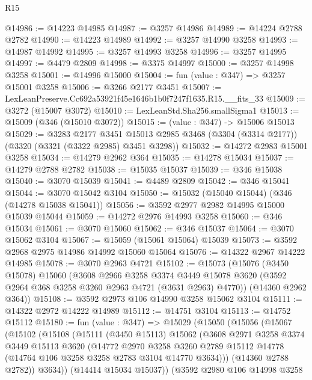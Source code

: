 \begin{lexlean}{R15}
\begin{coremodule}
@14986 := @14223 @14985
@14987 := @3257 @14986
@14989 := @14224 @2788 @2782
@14990 := @14223 @14989
@14992 := @3257 @14990 @3258
@14993 := @14987 @14992
@14995 := @3257 @14993 @3258
@14996 := @3257 @14995
@14997 := @4479 @2809
@14998 := @3375 @14997
@15000 := @3257 @14998 @3258
@15001 := @14996 @15000
@15004 := fun (value : @347) => @3257 @15001 @3258
@15006 := @3266 @2177 @3451
@15007 := LexLeanPreserve.Cc692a53921f45e1646b1b0f7247f1635.R15.__fits_33
@15009 := @3272 (@15007 @3072)
@15010 := LexLeanStd.Sha256.smallSigma1
@15013 := @15009 (@346 (@15010 @3072))
@15015 := (value : @347) -> @15006 @15013
@15029 := @3283
    @2177
    @3451
    @15013
    @2985
    @3468
    (@3304 (@3314 @2177))
    (@3320 (@3321 (@3322 @2985) @3451 @3298))
@15032 := @14272 @2983 @15001 @3258
@15034 := @14279 @2962 @364
@15035 := @14278 @15034
@15037 := @14279 @2788 @2782
@15038 := @15035 @15037
@15039 := @346 @15038
@15040 := @3070 @15039
@15041 := @4489 @2809
@15042 := @346 @15041
@15044 := @3070 @15042 @3104
@15050 := @15032 (@15040 @15044) (@346 (@14278 @15038 @15041))
@15056 := @3592 @2977 @2982 @14995 @15000 @15039 @15044
@15059 := @14272 @2976 @14993 @3258
@15060 := @346 @15034
@15061 := @3070 @15060
@15062 := @346 @15037
@15064 := @3070 @15062 @3104
@15067 := @15059 (@15061 @15064) @15039
@15073 := @3592 @2968 @2975 @14986 @14992 @15060 @15064
@15076 := @14322 @2967 @14222 @14985
@15078 := @3070 @2963 @4721
@15102 := @15073
    (@15076
      (@3450 @15078)
      @15060
      (@3608
        @2966
        @3258
        @3374
        @3449
        @15078
        @3620
        (@3592 @2964 @368 @3258 @3260 @2963 @4721 (@3631 @2963) @4770))
      (@14360 @2962 @364))
@15108 := @3592 @2973 @106 @14990 @3258 @15062 @3104
@15111 := @14322 @2972 @14222 @14989
@15112 := @14751 @3104
@15113 := @14752 @15112
@15180 := fun (value : @347) =>
  @15029
    (@15050
      (@15056
        (@15067
          (@15102
            (@15108
              (@15111
                (@3450 @15113)
                @15062
                (@3608
                  @2971
                  @3258
                  @3374
                  @3449
                  @15113
                  @3620
                  (@14772
                    @2970
                    @3258
                    @3260
                    @2789
                    @15112
                    @14778
                    (@14764 @106 @3258 @3258 @2783 @3104 @14770 @3634)))
                (@14360 @2788 @2782))
              @3634))
          (@14414 @15034 @15037))
        (@3592
          @2980
          @106
          @14998
          @3258

\end{coremodule}
\end{lexlean}
